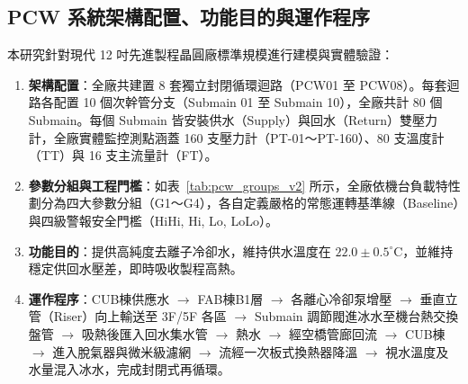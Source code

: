 \documentclass[fontset=none, a4paper, 12pt]{ctexart}
\begin{document}
\begin{doublespace}
\subsection{PCW 系統架構配置、功能目的與運作程序}
\label{sec:pcw_system_operation}
本研究針對現代 12 吋先進製程晶圓廠標準規模進行建模與實體驗證：
\begin{enumerate}
    \item \textbf{架構配置}：全廠共建置 8 套獨立封閉循環迴路（PCW01 至 PCW08）。每套迴路各配置 10 個次幹管分支（Submain 01 至 Submain 10），全廠共計 80 個Submain。每個 Submain 皆安裝供水（Supply）與回水（Return）雙壓力計，全廠實體監控測點涵蓋 160 支壓力計（PT-01～PT-160）、80 支溫度計（TT）與 16 支主流量計（FT）。
    \item \textbf{參數分組與工程門檻}：如表~\ref{tab:pcw_groups_v2} 所示，全廠依機台負載特性劃分為四大參數分組（G1～G4），各自定義嚴格的常態運轉基準線（Baseline）與四級警報安全門檻（HiHi, Hi, Lo, LoLo）。
    \item \textbf{功能目的}：提供高純度去離子冷卻水，維持供水溫度在 $22.0 \pm 0.5^\circ\mathrm{C}$，並維持穩定供回水壓差，即時吸收製程高熱。
    \item \textbf{運作程序}：CUB棟供應水 $\to$ FAB棟B1層 $\to$ 各離心冷卻泵增壓 $\to$ 垂直立管（Riser）向上輸送至 3F/5F 各區 $\to$ Submain 調節閥進冰水至機台熱交換盤管 $\to$ 吸熱後匯入回水集水管 $\to$ 熱水 $\to$ 經空橋管廊回流 $\to$ CUB棟 $\to$ 進入脫氣器與微米級濾網 $\to$ 流經一次板式換熱器降溫 $\to$ 視水溫度及水量混入冰水，完成封閉式再循環。
\end{enumerate}


\end{doublespace}
\end{document}
